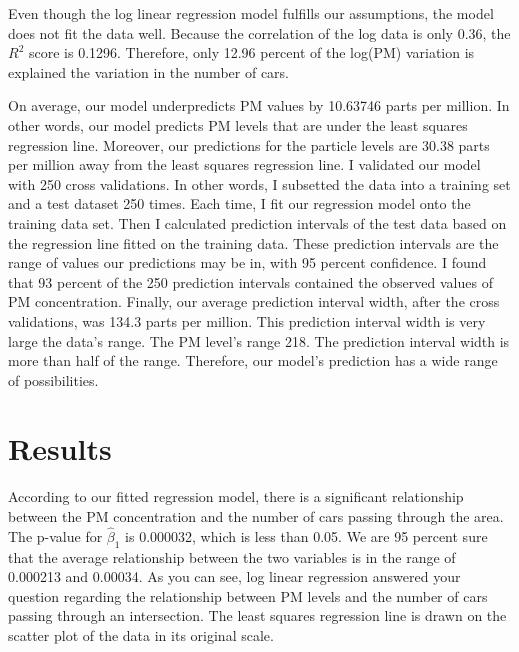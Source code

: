 \documentclass[12pt]{article}\usepackage[]{graphicx}\usepackage[]{color}
\begin{document}
Even though the log linear regression model fulfills our assumptions, the model does not fit the data well. Because the correlation of the log data is only 0.36, the $R^2$ score is 0.1296. Therefore, only 12.96 percent of the log(PM) variation is explained the variation in the number of cars. 




On average, our model underpredicts PM values by 10.63746 parts per million. In other words, our model predicts PM levels that are under the least squares regression line. Moreover, our predictions for the particle levels are 30.38 parts per million away from the least squares regression line. I validated our model with 250 cross validations. In other words, I subsetted the data into a training set and a test dataset 250 times. Each time, I fit our regression model onto the training data set. Then I calculated prediction intervals of the test data based on the regression line fitted on the training data. These prediction intervals are the range of values our predictions may be in, with 95 percent confidence. I found that 93 percent of the 250 prediction intervals contained the observed values of PM concentration. Finally, our average prediction interval width, after the cross validations, was 134.3 parts per million. This prediction interval width is very large the data's range. The PM level's range 218. The prediction interval width is more than half of the range. Therefore, our model's prediction has a wide range of possibilities. 


\section{Results}


According to our fitted regression model, there is a significant relationship between the PM concentration and the number of cars passing through the area. The p-value for $\hat\beta_1$ is 0.000032, which is less than 0.05. We are 95 percent sure that the average relationship between the two variables is in the range of 0.000213 and 0.00034. As you can see, log linear regression answered your question regarding the relationship between PM levels and the number of cars passing through an intersection. The least squares regression line is drawn on the scatter plot of the data in its original scale. 
\end{document}
